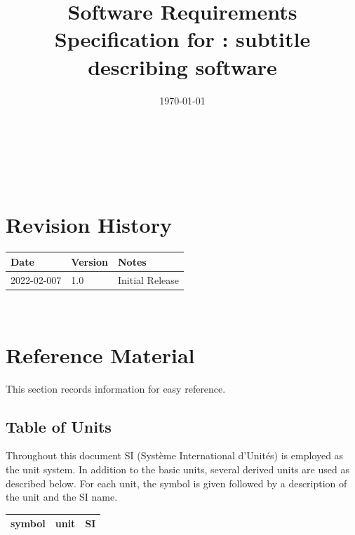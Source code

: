 \documentclass[12pt]{article}
\begin{document}
\title{Software Requirements Specification for \progname: subtitle describing software} 
\author{\authname}
\date{\today}
	
\maketitle

~\newpage


\tableofcontents

~\newpage

\section*{Revision History}

\begin{tabularx}{\textwidth}{p{3cm}p{2cm}X}
\toprule {\bf Date} & {\bf Version} & {\bf Notes}\\
\midrule
2022-02-007 & 1.0 & Initial Release\\
\bottomrule
\end{tabularx}
~\newpage

\section{Reference Material}

This section records information for easy reference.

\subsection{Table of Units}

Throughout this document SI (Syst\`{e}me International d'Unit\'{e}s) is employed
as the unit system.  In addition to the basic units, several derived units are
used as described below.  For each unit, the symbol is given followed by a
description of the unit and the SI name.
~\newline

\renewcommand{\arraystretch}{1.2}
  \noindent \begin{tabular}{l l l} 
    \toprule		
    \textbf{symbol} & \textbf{unit} & \textbf{SI}\\
    \midrule 
    \bottomrule
  \end{tabular}
\end{document}
